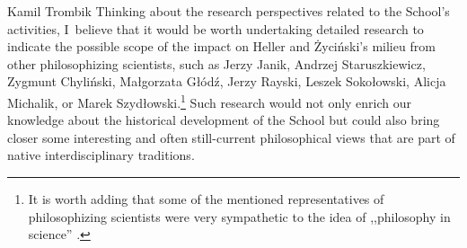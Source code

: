 \begin{artengenv}{Kamil Trombik}
Thinking about the research perspectives related to the School's activities, I~believe that it would be worth undertaking detailed research to indicate the possible scope of the impact on Heller and Życiński's milieu from other philosophizing scientists, such as Jerzy Janik, Andrzej Staruszkiewicz, Zygmunt Chyliński, Małgorzata Głódź, Jerzy Rayski, Leszek Sokołowski, Alicja Michalik, or Marek Szydłowski.\footnote{It is worth adding that some of the mentioned representatives of philosophizing scientists were very sympathetic to the idea of ,,philosophy in science'' 
\parencite[e.g][]{glodz_zfwn_1999}.%
} Such research would not only enrich our knowledge about the historical development of the School but could also bring closer some interesting and often still-current philosophical views that are part of native interdisciplinary traditions.



\end{artengenv}

